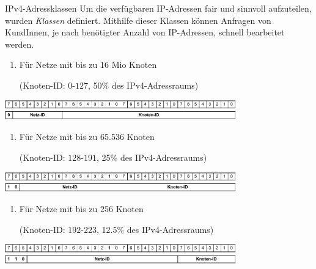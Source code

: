 \begin{defi}{IPv4-Adressklassen}
    Um die verfügbaren IP-Adressen fair und sinnvoll aufzuteilen, wurden \emph{Klassen} definiert.
    Mithilfe dieser Klassen können Anfragen von KundInnen, je nach benötigter Anzahl von IP-Adressen, schnell bearbeitet werden.

    \begin{enumerate}[label=Class \Alph*:, leftmargin=*]
        \item Für Netze mit bis zu 16 Mio Knoten

              (Knoten-ID: $0\text{-}127$, 50\% des IPv4-Adressraums)
    \end{enumerate}

    \begin{center}
        \includegraphics[width=0.75\textwidth]{includes/figures/bonus_class_a.pdf}
    \end{center}

    \begin{enumerate}[label=Class \Alph*:, leftmargin=*, start=2]
        \item Für Netze mit bis zu 65.536 Knoten

              (Knoten-ID: $128\text{-}191$, 25\% des IPv4-Adressraums)
    \end{enumerate}

    \begin{center}
        \includegraphics[width=0.75\textwidth]{includes/figures/bonus_class_b.pdf}
    \end{center}

    \begin{enumerate}[label=Class \Alph*:, leftmargin=*, start=3]
        \item Für Netze mit bis zu 256 Knoten

              (Knoten-ID: $192\text{-}223$, 12.5\% des IPv4-Adressraums)
    \end{enumerate}

    \begin{center}
        \includegraphics[width=0.75\textwidth]{includes/figures/bonus_class_c.pdf}
    \end{center}


\end{defi}
